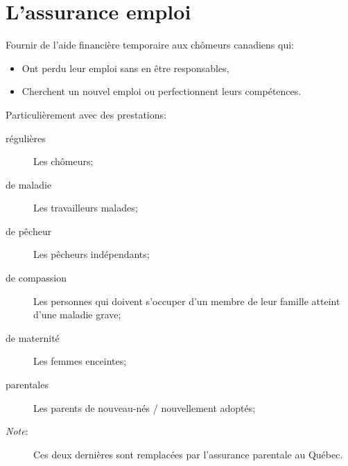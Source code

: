 \documentclass[10pt, french]{article}
\begin{document}
\begin{multicols*}{3}
\begin{definitionNOHFILLsub}
\end{definitionNOHFILLsub}

\newpage

\section{L’assurance emploi}

\begin{definitionNOHFILLsub}[Objectifs]
Fournir de l'aide financière temporaire aux chômeurs canadiens qui:
\begin{itemize}[leftmargin = *]
	\item	Ont perdu leur emploi sans en être responsables,
	\item	Cherchent un nouvel emploi ou perfectionnent leurs compétences.
\end{itemize}

Particulièrement avec des prestations:
\begin{description}
	\item[régulières]	Les chômeurs;	
	\item[de maladie]	Les travailleurs malades;
	\item[de pêcheur]	Les pêcheurs indépendants;
	\item[de compassion]	Les personnes qui doivent s'occuper d'un membre de leur famille atteint d'une maladie grave;
	\item[de maternité]	Les femmes enceintes;
	\item[parentales]	Les parents de nouveau-nés / nouvellement adoptés;
	\item[\textit{Note}:]	Ces deux dernières sont remplacées par l'assurance parentale au Québec.
\end{description}
\end{definitionNOHFILLsub}


\end{multicols*}
\end{document}
